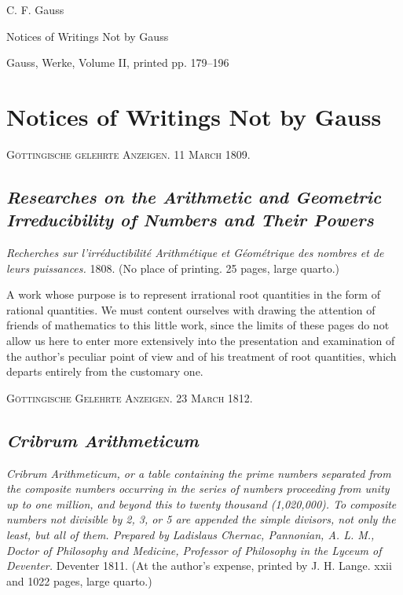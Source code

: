 \documentclass[12pt]{article}
\begin{document}
\clearpage

\begin{center}
{\Large C. F. Gauss}\par
{\large Notices of Writings Not by Gauss}\par
{\normalsize Gauss, Werke, Volume II, printed pp. 179--196}\par
\end{center}

\section*{Notices of Writings Not by Gauss}

\begin{center}
\textsc{Göttingische gelehrte Anzeigen. 11 March 1809.}
\end{center}

\subsection*{\textit{Researches on the Arithmetic and Geometric Irreducibility of Numbers and Their Powers}}

\begin{center}
\textit{Recherches sur l'irréductibilité Arithmétique et Géométrique des nombres et de leurs puissances.} 1808. (No place of printing. 25 pages, large quarto.)
\end{center}

A work whose purpose is to represent irrational root quantities in the form of rational quantities. We must content ourselves with drawing the attention of friends of mathematics to this little work, since the limits of these pages do not allow us here to enter more extensively into the presentation and examination of the author's peculiar point of view and of his treatment of root quantities, which departs entirely from the customary one.

\begin{center}
\textsc{Göttingische Gelehrte Anzeigen. 23 March 1812.}
\end{center}

\subsection*{\textit{Cribrum Arithmeticum}}

\begin{center}
\textit{Cribrum Arithmeticum, or a table containing the prime numbers separated from the composite numbers occurring in the series of numbers proceeding from unity up to one million, and beyond this to twenty thousand (1,020,000). To composite numbers not divisible by 2, 3, or 5 are appended the simple divisors, not only the least, but all of them. Prepared by Ladislaus Chernac, Pannonian, A. L. M., Doctor of Philosophy and Medicine, Professor of Philosophy in the Lyceum of Deventer.} Deventer 1811. (At the author's expense, printed by J. H. Lange. xxii and 1022 pages, large quarto.)
\end{center}
\end{document}

